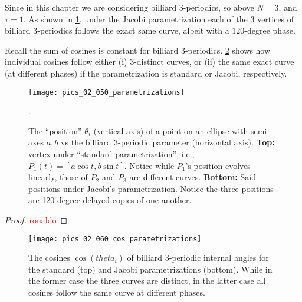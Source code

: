 Since in this chapter we are considering billiard 3-periodics, so above $N=3$, and $\tau=1$. As shown in \cref{fig:02-jacobi-param}, under the Jacobi parametrization each of the 3 vertices of billiard 3-periodics follows the exact same curve, albeit with a 120-degree phase.

Recall the sum of cosines is constant for billiard 3-periodics. \cref{fig:02-jacobi-cos-param} shows how individual cosines follow either (i) 3-distinct curves, or (ii) the same exact curve (at different phases) if the parametrization is standard or Jacobi, respectively.

\begin{figure}
    \centering
    \texttt{[image: pics\_02\_050\_parametrizations]}
    \caption{The ``position'' $\theta_i$ (vertical axis) of a point on an ellipse with semi-axes $a,b$ vs the billiard 3-periodic parameter (horizontal axis). \textbf{Top:} vertex  under ``standard parametrization'', i.e., $P_1(t)=[a\cos{t},b\sin{t}]$. Notice while $P_1$'s position evolves linearly, those of $P_2$ and $P_3$ are different curves. \textbf{Bottom:} Said positions under Jacobi's parametrization. Notice the three positions are 120-degree delayed copies of one another.}. 
    \label{fig:02-jacobi-param}
\end{figure}

\begin{proof}
\textcolor{red}{ronaldo}
\end{proof}
\begin{figure}
    \centering
    \texttt{[image: pics\_02\_060\_cos\_parametrizations]}
    \caption{The cosines $\cos(theta_i)$ of billiard 3-periodic internal angles for the standard (top) and Jacobi parametrizations (bottom). While in the former case the three curves are distinct, in the latter case all cosines follow the same curve at different phases.}
    \label{fig:02-jacobi-cos-param}
\end{figure}
